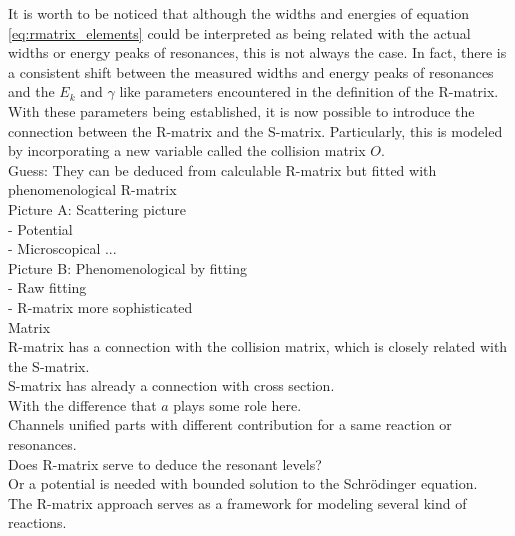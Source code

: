 \documentclass[openany]{book}
\begin{document}
It is worth to be noticed that although the widths and energies of equation \ref{eq:rmatrix_elements} could be interpreted as being related with the actual widths or energy peaks of resonances, this is not always the case. In fact, there is a consistent shift between the measured widths and energy peaks of resonances and the $E_k$ and $\gamma$ like parameters encountered in the definition of the R-matrix.  \\

With these parameters being established, it is now possible to introduce the connection between the R-matrix and the S-matrix. Particularly, this is modeled by incorporating a new variable called the collision matrix $O$. \\

Guess: They can be deduced from calculable R-matrix
but fitted with phenomenological R-matrix \\

Picture A: Scattering picture \\
	-	Potential \\
	-	Microscopical ... \\
	
Picture B: Phenomenological by fitting \\
	-	 Raw fitting \\
	-	R-matrix more sophisticated  \\

Matrix \\

R-matrix has a connection with the collision matrix, which is closely related with the S-matrix.  \\

S-matrix has already a connection with cross section. \\

With the difference that $a$ plays some role here.  \\

Channels unified parts with different contribution for a same reaction or resonances.  \\

Does R-matrix serve to deduce the resonant levels?  \\

Or a potential is needed with bounded solution to the Schrödinger equation.   \\

The R-matrix approach serves as a framework for modeling several kind of reactions.  \\
\end{document}
